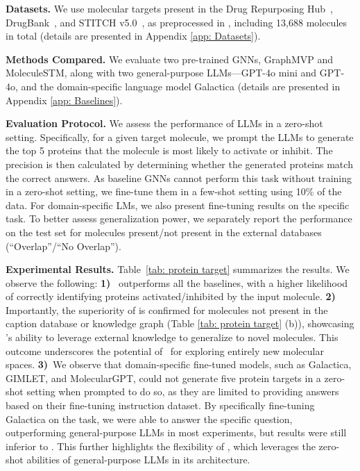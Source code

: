 \textbf{Datasets.} We use molecular targets present in the Drug Repurposing Hub~\cite{corsello2017drug}, DrugBank~\cite{wishart2018drugbank}, and STITCH v5.0~\cite{szklarczyk2016stitch}, as preprocessed in \citealp{zheng2023chempert}, including 13,688 molecules in total (details are presented in Appendix \ref{app: Datasets}). 


\textbf{Methods Compared.}
We evaluate two pre-trained GNNs, GraphMVP and MoleculeSTM, along with two general-purpose LLMs—GPT-4o mini and GPT-4o, and the domain-specific language model Galactica \cite{taylor2022galactica} (details are presented in Appendix \ref{app: Baselines}).

\textbf{Evaluation Protocol.}
We assess the performance of LLMs in a zero-shot setting. 
Specifically, for a given target molecule, we prompt the LLMs to generate the top 5 proteins that the molecule is most likely to activate or inhibit. The precision is then calculated by determining whether the generated proteins match the correct answers.
As baseline GNNs cannot perform this task without training in a zero-shot setting, we fine-tune them in a few-shot setting using 10\% of the data. 
For domain-specific LMs, we also present fine-tuning results  on the specific task. 
To better assess generalization power, we separately report the performance on the test set for molecules present/not present in the external databases (``Overlap''/``No Overlap'').




\textbf{Experimental Results.}
Table~\ref{tab: protein target} summarizes the results. We observe the following:
\textbf{1)} \proposed~outperforms all the baselines, with a higher likelihood of correctly identifying proteins activated/inhibited by the input molecule. 
\textbf{2)} Importantly, the superiority of \proposed is confirmed for molecules not present in the caption database or knowledge graph (Table \ref{tab: protein target} (b)), showcasing \proposed's ability to leverage external knowledge to generalize to novel molecules.
This outcome underscores the potential of \proposed~for exploring entirely new molecular spaces.
\textbf{3)}~We observe that domain-specific fine-tuned models, such as Galactica, GIMLET, and MolecularGPT, could not generate five protein targets in a zero-shot setting when prompted to do so, as they are limited to providing answers based on their fine-tuning instruction dataset. By specifically fine-tuning Galactica on the task, we were able to answer the specific question, outperforming general-purpose LLMs in most experiments, but results were still inferior to \proposed.
This further highlights the flexibility of \proposed, which leverages the zero-shot abilities of general-purpose LLMs in its architecture. %



